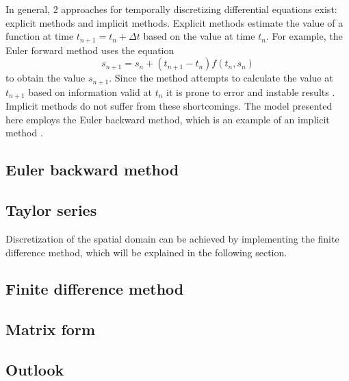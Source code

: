 In general, 2 approaches for temporally discretizing differential equations exist:  explicit methods and implicit methods.  Explicit methods estimate the value of a function at time $t_{n+1} = t_n + \Delta t$ based on the value at time $t_n$. For example, the Euler forward method uses the equation
\begin{equation}
  \label{eq:euformeth}
  s_{n+1} = s_n + (t_{n+1} - t_n) f(t_n,s_n)
\end{equation}
to obtain the value $s_{n+1}$.  Since the method attempts to calculate the value at $t_{n+1}$ based on information valid at $t_n$ it is prone to error and instable results \parencite{Weisstein2017a}.  Implicit methods do not suffer from these shortcomings.  The model presented here employs the Euler backward method, which is an example of an implicit method \parencite{Weisstein2017b}.

\subsection{Euler backward method}


\subsection{Taylor series}


Discretization of the spatial domain can be achieved by implementing the finite difference method, which will be explained in the following section.

\subsection{Finite difference method}


\subsection{Matrix form}


\subsection{Outlook}


